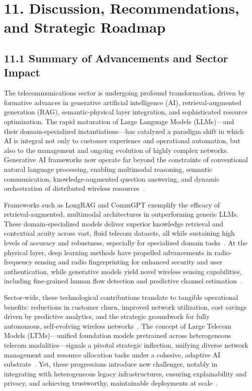 \documentclass[11pt]{article}
\begin{document}
\section{11. Discussion, Recommendations, and Strategic Roadmap}

\subsection{11.1 Summary of Advancements and Sector Impact}

The telecommunications sector is undergoing profound transformation, driven by formative advances in generative artificial intelligence (AI), retrieval-augmented generation (RAG), semantic-physical layer integration, and sophisticated resource optimization. The rapid maturation of Large Language Models (LLMs)—and their domain-specialized instantiations—has catalyzed a paradigm shift in which AI is integral not only to customer experience and operational automation, but also to the management and ongoing evolution of highly complex networks. Generative AI frameworks now operate far beyond the constraints of conventional natural language processing, enabling multimodal reasoning, semantic communication, knowledge-augmented question answering, and dynamic orchestration of distributed wireless resources~\cite{ref7,ref16}. 

Frameworks such as LongRAG and CommGPT exemplify the efficacy of retrieval-augmented, multimodal architectures in outperforming generic LLMs. These domain-specialized models deliver superior knowledge retrieval and contextual acuity across vast, fluid telecom datasets, all while sustaining high levels of accuracy and robustness, especially for specialized domain tasks~\cite{ref7,ref16}. At the physical layer, deep learning methods have propelled advancements in radio-frequency sensing and radio fingerprinting for enhanced security and user authentication, while generative models yield novel wireless sensing capabilities, including fine-grained human flow detection and predictive channel estimation~\cite{ref18,ref19,ref21}.

Sector-wide, these technological contributions translate to tangible operational benefits: reductions in customer churn, improved network utilization, cost savings driven by predictive analytics, and the strategic groundwork for fully autonomous, self-evolving wireless networks~\cite{ref16,ref46}. The concept of Large Telecom Models (LTMs)—unified foundation models pretrained across heterogeneous telecom modalities—signals a pivotal strategic inflection, unifying diverse network management and resource allocation tasks under a cohesive, adaptive AI substrate~\cite{ref16}. Yet, these progressions introduce new challenges, notably in integrating with heterogeneous legacy infrastructures, ensuring explainability and privacy, and achieving trustworthy, maintainable deployments at scale~\cite{ref7,ref16,ref17,ref18,ref46}.
\end{document}
